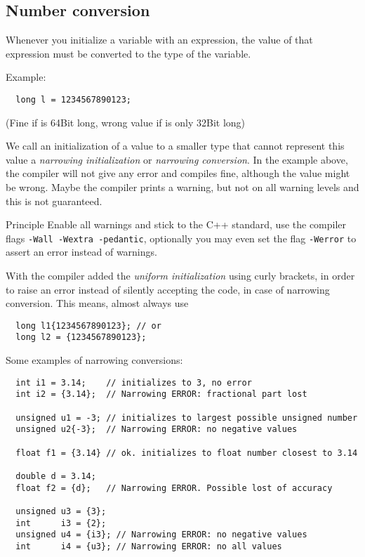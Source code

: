 \subsection{Number conversion}
Whenever you initialize a variable with an expression, the value of that expression must be converted to the type of the variable.

Example:
\begin{verbatim}
  long l = 1234567890123;
\end{verbatim}
(Fine if  is 64Bit long, wrong value if  is only 32Bit long)

We call an initialization of a value to a smaller type that cannot represent this value a \emph{narrowing initialization} or
\emph{narrowing conversion}. In the example above, the compiler will not give any error and compiles fine, although the value might be wrong.
Maybe the compiler prints a warning, but not on all warning levels and this is not guaranteed.

\begin{guideline}{Principle}
  Enable all warnings and stick to the C++ standard, \ie use the compiler flags \texttt{-Wall -Wextra -pedantic}, optionally you may
  even set the flag \texttt{-Werror} to assert an error instead of warnings.
\end{guideline}

With\marginpar{[\cxx{11}]}  the compiler added the \emph{uniform initialization} using curly brackets, in order to raise an error
instead of silently accepting the code, in case of narrowing conversion. This means, almost always use
\begin{verbatim}
  long l1{1234567890123}; // or
  long l2 = {1234567890123};
\end{verbatim}

Some examples of narrowing conversions:
\begin{verbatim}
  int i1 = 3.14;    // initializes to 3, no error
  int i2 = {3.14};  // Narrowing ERROR: fractional part lost

  unsigned u1 = -3; // initializes to largest possible unsigned number
  unsigned u2{-3};  // Narrowing ERROR: no negative values

  float f1 = {3.14} // ok. initializes to float number closest to 3.14

  double d = 3.14;
  float f2 = {d};   // Narrowing ERROR. Possible lost of accuracy

  unsigned u3 = {3};
  int      i3 = {2};
  unsigned u4 = {i3}; // Narrowing ERROR: no negative values
  int      i4 = {u3}; // Narrowing ERROR: no all values
\end{verbatim}

